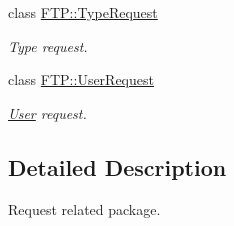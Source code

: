 \begin{DoxyCompactItemize}
class \hyperlink{classFTP_1_1TypeRequest}{F\+T\+P\+::\+Type\+Request}
\begin{DoxyCompactList}\small\item\em Type request. \end{DoxyCompactList}\item 
class \hyperlink{classFTP_1_1UserRequest}{F\+T\+P\+::\+User\+Request}
\begin{DoxyCompactList}\small\item\em \hyperlink{structFTP_1_1User}{User} request. \end{DoxyCompactList}\end{DoxyCompactItemize}


\subsection{Detailed Description}
Request related package. 